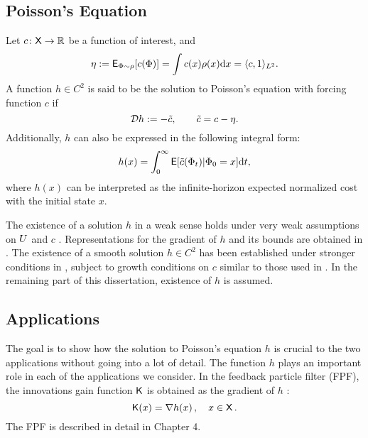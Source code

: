\subsection{Poisson's Equation}
Let $c \colon {\sf X} \to \mathbb{R}$ be a function of interest, and 
\begin{equation}
\eta := {\sf E}_{\Phi \sim \rho}[c(\Phi)] =  \int c(x) \rho(x) \text{d} x = \langle c, 1 \rangle_{L^2}.
\end{equation}
A function $h\in C^2$ is said to be the solution to Poisson's equation with forcing function $c$ if
\begin{equation}
\generate h := - \tilc, \qquad  \tilc = c - \eta.
\label{e:poissons}
\end{equation}
Additionally, $h$ can also be expressed in the following integral form:
\begin{equation}
h(x) =\int_0^\infty {\sf E}[\tilde c(\Phi_t)|\Phi_0 = x] \text{d} t,
\end{equation}
where $h(x)$ can be interpreted as the infinite-horizon expected normalized cost with the initial state $x$. 

The existence of a solution $h$ in a weak sense holds under very weak assumptions on $U$ and $c$  \cite{glymey96a,konmey12a}.   Representations for the gradient of $h$ and its bounds are obtained in \cite{laumehmeyrag15,devkonmey17b}.   The existence of  a  smooth solution $h\in C^2$ has been established under stronger conditions in \cite{parver01}, subject to growth conditions on $c$ similar to those used in  \cite{glymey96a}. In the remaining part of this dissertation, existence of $h$ is assumed. 

\subsection{Applications} 
The goal is to show how the solution to Poisson's equation $h$ is crucial to the two applications without going into a lot of detail.  
The function $h$ plays an important role in each of the applications we consider. In the feedback particle filter (FPF), the innovations gain function $\text{\sf K}$ is obtained as  the gradient of $h$ \cite{yanmehmey13}:
\begin{equation}
\kFPF (x) = \nabla h(x)\, ,  \quad x\in\state\, .
\label{e:fpfgain}
\end{equation}
The FPF is described in detail in Chapter 4. %

